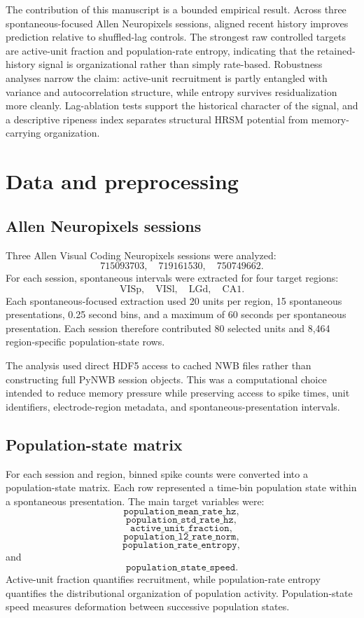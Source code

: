 \documentclass[11pt]{article}
\begin{document}
The contribution of this manuscript is a bounded empirical result. Across three spontaneous-focused Allen Neuropixels sessions, aligned recent history improves prediction relative to shuffled-lag controls. The strongest raw controlled targets are active-unit fraction and population-rate entropy, indicating that the retained-history signal is organizational rather than simply rate-based. Robustness analyses narrow the claim: active-unit recruitment is partly entangled with variance and autocorrelation structure, while entropy survives residualization more cleanly. Lag-ablation tests support the historical character of the signal, and a descriptive ripeness index separates structural HRSM potential from memory-carrying organization.

\section{Data and preprocessing}

\subsection{Allen Neuropixels sessions}

Three Allen Visual Coding Neuropixels sessions were analyzed:
\[
715093703,\quad 719161530,\quad 750749662.
\]
For each session, spontaneous intervals were extracted for four target regions:
\[
\mathrm{VISp},\quad \mathrm{VISl},\quad \mathrm{LGd},\quad \mathrm{CA1}.
\]
Each spontaneous-focused extraction used 20 units per region, 15 spontaneous presentations, 0.25 second bins, and a maximum of 60 seconds per spontaneous presentation. Each session therefore contributed 80 selected units and 8,464 region-specific population-state rows.

The analysis used direct HDF5 access to cached NWB files rather than constructing full PyNWB session objects. This was a computational choice intended to reduce memory pressure while preserving access to spike times, unit identifiers, electrode-region metadata, and spontaneous-presentation intervals.

\subsection{Population-state matrix}

For each session and region, binned spike counts were converted into a population-state matrix. Each row represented a time-bin population state within a spontaneous presentation. The main target variables were:
\[
\texttt{population\_mean\_rate\_hz},
\]
\[
\texttt{population\_std\_rate\_hz},
\]
\[
\texttt{active\_unit\_fraction},
\]
\[
\texttt{population\_l2\_rate\_norm},
\]
\[
\texttt{population\_rate\_entropy},
\]
and
\[
\texttt{population\_state\_speed}.
\]
Active-unit fraction quantifies recruitment, while population-rate entropy quantifies the distributional organization of population activity. Population-state speed measures deformation between successive population states.
\end{document}
